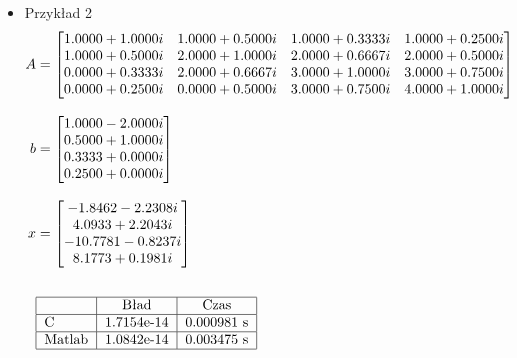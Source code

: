 \documentclass[12pt, flegn, leqno]{article}
\begin{document}
\begin{itemize}
            \item{Przykład 2}
            \begin{align*}
                A &= 
                \begin{bmatrix}
                    1.0000 + 1.0000i & 1.0000 + 0.5000i & 1.0000 + 0.3333i & 1.0000 + 0.2500i\\
                    1.0000 + 0.5000i & 2.0000 + 1.0000i & 2.0000 + 0.6667i & 2.0000 + 0.5000i\\
                    0.0000 + 0.3333i & 2.0000 + 0.6667i & 3.0000 + 1.0000i & 3.0000 + 0.7500i\\
                    0.0000 + 0.2500i & 0.0000 + 0.5000i & 3.0000 + 0.7500i & 4.0000 + 1.0000i\\
                \end{bmatrix} \\[3mm]
                b &= 
                \begin{bmatrix}
                    1.0000 - 2.0000i\\
                    0.5000 + 1.0000i\\
                    0.3333 + 0.0000i\\
                    0.2500 + 0.0000i\\
                \end{bmatrix} \\[3mm]
                x &= 
                \begin{bmatrix}
                    -1.8462 - 2.2308i\\
                    4.0933 + 2.2043i\\
                    -10.7781 - 0.8237i\\
                    8.1773 + 0.1981i\\
                \end{bmatrix} \\[6mm] 
                &\begin{tabular}{ | l | c | c |}
                    \hline 
                    & Bład & Czas\\ \hline
                    C & 1.7154e-14 & 0.000981 s \\ \hline
                    Matlab & 1.0842e-14 & 0.003475 s \\
                    \hline
                \end{tabular}
            \end{align*}


\end{itemize}
\end{document}

